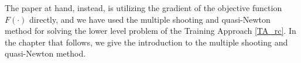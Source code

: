 The paper at hand, instead, is utilizing the gradient of the objective function $F(\cdot)$ directly, and we have used the multiple shooting and quasi-Newton method for solving the lower level problem of the Training Approach \ref{TA_rc}. In the chapter that follows, we give the introduction to the multiple shooting and quasi-Newton method. 




 










 














